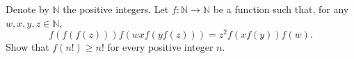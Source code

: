 Denote by $\mathbb{N}$ the positive integers. Let $f:\mathbb{N} \rightarrow \mathbb{N}$ be a function such that, for any $w,x,y,z \in \mathbb{N}$,  \[ f(f(f(z)))f(wxf(yf(z)))=z^{2}f(xf(y))f(w). \]Show that $f(n!) \ge n!$ for every positive integer $n$.
